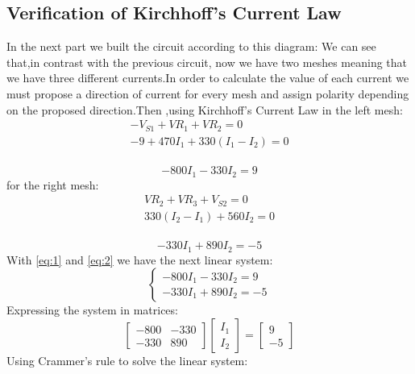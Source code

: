 \documentclass[a4paper]{article}
\begin{document}
\subsection{Verification of Kirchhoff's Current Law}
In the next part we built the circuit according to this diagram:
We can see that,in contrast with the previous circuit, now we have two meshes meaning that we
have three different currents.In order to calculate the value of each current we must propose a
direction of current for every mesh and assign polarity depending on the proposed direction.Then
,using Kirchhoff's Current Law in the left mesh:
\begin{gather*}
    -V_{S1}+VR_1+VR_2=0\\
    -9+470I_1+330(I_1-I_2)=0
\end{gather*}\\[-7ex]
\begin{equation}-800I_1-330I_2=9\label{eq:1}\end{equation}
for the right mesh:
\begin{gather*}
    VR_2+VR_3+V_{S2}=0\\
    330(I_2-I_1)+560I_2=0
\end{gather*}\\[-7ex]
\begin{equation}-330I_1+890I_2=-5\label{eq:2}\end{equation}
With \eqref{eq:1} and  \eqref{eq:2} we have the next linear system:
\[
    \begin{cases}
        -800I_1-330I_2=9\\
        -330I_1+890I_2=-5
    \end{cases}
\]
Expressing the system in matrices:
\[
    \begin{bmatrix}
        -800 & -330\\
        -330 & 890
    \end{bmatrix}
    \begin{bmatrix}
        I_1\\
        I_2
    \end{bmatrix}
    =
    \begin{bmatrix}
        9\\
        -5
    \end{bmatrix}
\]
Using Crammer's rule to solve the linear system:
\end{document}
